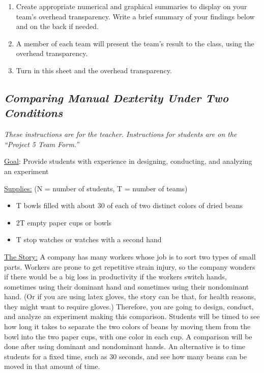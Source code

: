\documentclass[twoside,openany]{tufte-book}
\begin{document}
\begin{enumerate}[leftmargin=1cm, itemsep=.2em]
\item Create appropriate numerical and graphical summaries to display on your team's overhead transparency. Write a brief summary of your findings below and on the back if needed. 
\item A member of each team will present the team's result to the class, using the overhead transparency.
\item Turn in this sheet and the overhead transparency.
\end{enumerate}

\newpage

\subsection{\textbf{\textit{Comparing Manual Dexterity Under Two Conditions}}}

\textit{These instructions are for the teacher. Instructions for students are on the ``Project 5 Team Form.''}\\
\vspace{10pt}

\noindent\underline{Goal}: Provide students with experience in designing, conducting, and analyzing an experiment\\

\vspace{10pt}

\noindent\underline{Supplies:} (N = number of students, T = number of teams)
\begin{itemize}[leftmargin=1cm, itemsep=.2em]
\item T bowls filled with about 30 of each of two distinct colors of dried beans
\item 2T empty paper cups or bowls
\item T stop watches or watches with a second hand
\end{itemize}

\noindent\underline{The Story:} A company has many workers whose job is to sort two types of small parts. Workers are prone to get repetitive strain injury, so the company wonders if there would be a big loss in productivity if the workers switch hands, sometimes using their dominant hand and sometimes using their nondominant hand. (Or if you are using latex gloves, the story can be that, for health reasons, they might want to require gloves.) Therefore, you are going to design, conduct, and analyze an experiment making this comparison. Students will be timed to see how long it takes to separate the two colors of beans by moving them from the bowl into the two paper cups, with one color in each cup. A comparison will be done after using dominant and nondominant hands. An alternative is to time students for a fixed time, such as 30 seconds, and see how many beans can be moved in that amount of time.
\end{document}
